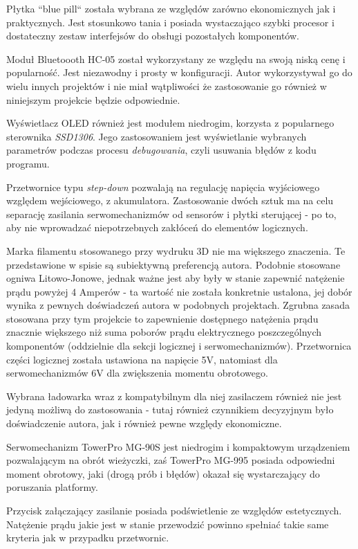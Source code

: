 Płytka ``blue pill`` została wybrana ze względów zarówno ekonomicznych jak i praktycznych. Jest stosunkowo tania i posiada wystaczająco szybki procesor i dostateczny zestaw interfejsów do obsługi pozostałych komponentów.

Moduł Bluetoooth HC-05 został wykorzystany ze względu na swoją niską cenę i popularność. Jest niezawodny i prosty w konfiguracji. Autor wykorzystywał go do wielu innych projektów i nie miał wątpliwości że zastosowanie go również w niniejszym projekcie będzie odpowiednie.

Wyświetlacz OLED również jest modułem niedrogim, korzysta z popularnego sterownika \emph{SSD1306}. Jego zastosowaniem jest wyświetlanie wybranych parametrów podczas procesu \emph{debugowania}, czyli usuwania błędów z kodu programu.

Przetwornice typu \emph{step-down} pozwalają na regulację napięcia wyjściowego względem wejściowego, z akumulatora. Zastosowanie dwóch sztuk ma na celu separację zasilania serwomechanizmów od sensorów i płytki sterującej - po to, aby nie wprowadzać niepotrzebnych zakłóceń do elementów logicznych.

Marka filamentu stosowanego przy wydruku 3D nie ma większego znaczenia. Te przedstawione w spisie są subiektywną preferencją autora. Podobnie stosowane ogniwa Litowo-Jonowe, jednak ważne jest aby były w stanie zapewnić natężenie prądu powyżej 4 Amperów - ta wartość nie została konkretnie ustalona, jej dobór wynika z pewnych doświadczeń autora w podobnych projektach. Zgrubna zasada stosowana przy tym projekcie to zapewnienie dostępnego natężenia prądu znacznie większego niż suma poborów prądu elektrycznego poszczególnych komponentów (oddzielnie dla sekcji logicznej i serwomechanizmów). Przetwornica części logicznej została ustawiona na napięcie 5V, natomiast dla serwomechanizmów 6V dla zwiększenia momentu obrotowego.

Wybrana ładowarka wraz z kompatybilnym dla niej zasilaczem również nie jest jedyną możliwą do zastosowania - tutaj również czynnikiem decyzyjnym było doświadczenie autora, jak i również pewne względy ekonomiczne.

Serwomechanizm TowerPro MG-90S jest niedrogim i kompaktowym urządzeniem pozwalającym na obrót wieżyczki, zaś TowerPro MG-995 posiada odpowiedni moment obrotowy, jaki (drogą prób i błędów) okazał się wystarczający do poruszania platformy.

Przycisk załączający zasilanie posiada podświetlenie ze względów estetycznych. Natężenie prądu jakie jest w stanie przewodzić powinno spełniać takie same kryteria jak w przypadku przetwornic.

